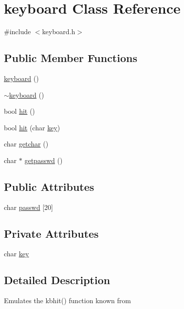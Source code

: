 \hypertarget{classkeyboard}{\section{keyboard Class Reference}
\label{classkeyboard}
}


{\ttfamily \#include $<$keyboard.\-h$>$}

\subsection*{Public Member Functions}
\begin{DoxyCompactItemize}
\item 
\hyperlink{classkeyboard_ac8a026376e79f204ebccd4a0e0eef2f9}{keyboard} ()
\item 
\hyperlink{classkeyboard_a6ee90db5c7b4d44b37724711b6048c34}{$\sim$keyboard} ()
\item 
bool \hyperlink{classkeyboard_acafcfa9baee58ec7f2d5b37995f739f0}{hit} ()
\item 
bool \hyperlink{classkeyboard_a9fc7aa1041b37981a784a9fb750bd355}{hit} (char \hyperlink{classkeyboard_aa38f064c4a946810840ec389c4df81d6}{key})
\item 
char \hyperlink{classkeyboard_a14c52ad4acba6c5b4637ebb8ba2d57fc}{getchar} ()
\item 
char $\ast$ \hyperlink{classkeyboard_ab1be3946c44e55ea5177f077b9f745d6}{getpasswd} ()
\end{DoxyCompactItemize}
\subsection*{Public Attributes}
\begin{DoxyCompactItemize}
\item 
char \hyperlink{classkeyboard_aacee1ab06d08c89eae28515ac52d4333}{passwd} \mbox{[}20\mbox{]}
\end{DoxyCompactItemize}
\subsection*{Private Attributes}
\begin{DoxyCompactItemize}
\item 
char \hyperlink{classkeyboard_aa38f064c4a946810840ec389c4df81d6}{key}
\end{DoxyCompactItemize}


\subsection{Detailed Description}
Emulates the kbhit() function known from

